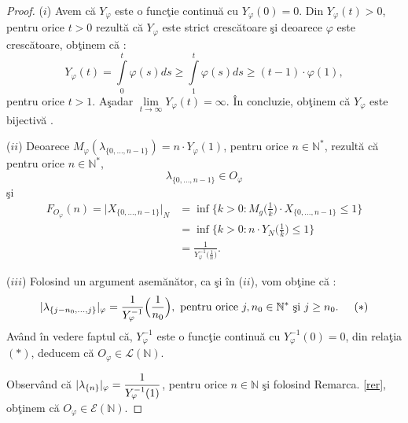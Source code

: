 \documentclass[ a4paper, 12pt]{report}
\theoremstyle{definition}
\theoremstyle{remark}
\numberwithin{equation}{section}
\begin{document}
\begin{proof} ($i$)  Avem c\u a $Y_\varphi$ este o func\c tie continu\u a cu $Y_\varphi(0) = 0$. Din $Y_\varphi(t) > 0$, pentru orice $t >0$ rezult\u a c\u a $Y_\varphi$ este strict cresc\u atoare \c si deoarece $\varphi$ este cresc\u atoare, ob\c tinem c\u a :
$$Y_\varphi(t)  = \int\limits_{0}^{t} \varphi(s) ds \geq \int\limits_{1}^{t} \varphi(s) ds \geq (t-1) \cdot \varphi(1),$$ pentru orice  $t > 1$. A\c sadar $\lim\limits_{t \rightarrow \infty} Y_\varphi(t) = \infty.$ \^In concluzie, ob\c tinem c\u a $Y_\varphi$ este bijectiv\u a .

\smallskip

($ii$) Deoarece $M_\varphi(\lambda_{\{0, \ldots, n-1\}}) = n \cdot Y_\varphi(1)$, pentru orice $ n \in \mathbb{N}^{\ast}$, rezult\u a c\u a pentru orice $n \in \mathbb{N}^{\ast}$,
$$\lambda_{\{0, \ldots, n-1\}} \in O_\varphi$$ \c si
\begin{align*}
F_{O_{\varphi}}(n) = \lvert X_{\{0,\ldots, n-1\}}\rvert_{N} &= \inf\Big\{k >0 : M_g\Big(\frac{1}{k}\Big) \cdot X_{\{0, \ldots, n-1\}}\leq 1 \Big\}\\
 &= \inf \Big\{ k>0 : n \cdot Y_N\Big(\frac{1}{k}\Big) \leq 1 \Big\}\\
  &= \frac{1}{Y_\varphi^{-1}\Big(\frac{1}{n}\Big)}.
\end{align*}

\smallskip

($iii$) Folosind un argument asem\u an\u ator, ca \c si \^in ($ii$), vom ob\c tine c\u a :
$$\lvert \lambda_{\{ j-n_0, \ldots , j \}} \rvert_{\varphi} =\frac{1}{Y_\varphi^{-1}}\Big(\frac{1}{n_0}\Big),\ \mbox{pentru orice}\  j,n_0 \in \mathbb{N}^{\ast}\ \mbox{\c si}\ j \geq n_0. \hspace{5mm} (\ast)$$
Av\^and \^in vedere faptul c\u a, $Y_\varphi^{-1}$ este o func\c tie continu\u a cu $Y_\varphi^{-1}(0) = 0$, din rela\c tia $(\ast)$, deducem c\u a $O_\varphi \in \mathcal{L}(\mathbb{N}).$

Observ\^and c\u a $\lvert \lambda_{\{ n \}} \rvert_{\varphi} = \displaystyle\frac{1}{Y_\varphi^{-1}(1)}$, pentru orice $n \in \mathbb{N}$ \c si folosind Remarca. \ref{rer}, ob\c tinem c\u a $O_\varphi \in \mathcal{E}(\mathbb{N}).$
\end{proof}
\end{document}
